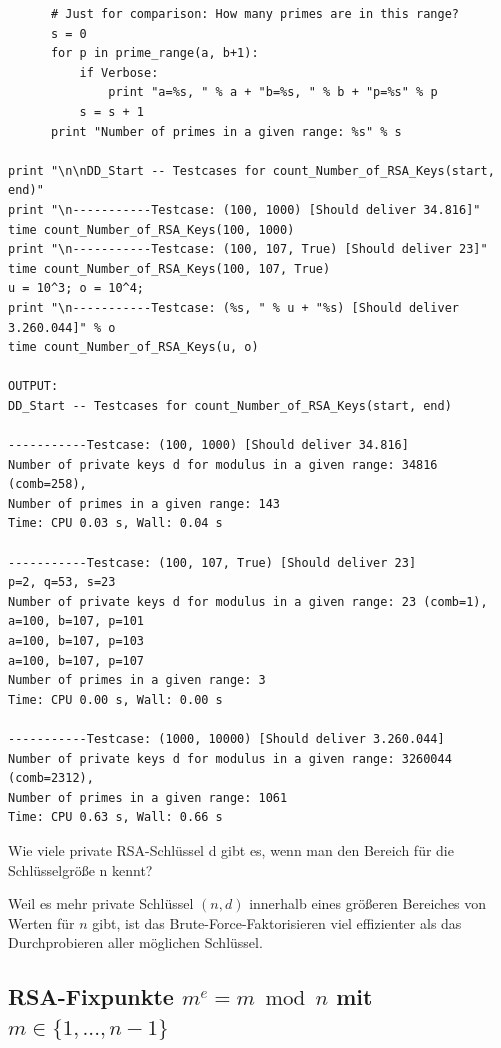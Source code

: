 \begin{refsegment}
\begin{sagecode}
\begin{Verbatim}
      # Just for comparison: How many primes are in this range?
      s = 0
      for p in prime_range(a, b+1):
          if Verbose:
              print "a=%s, " % a + "b=%s, " % b + "p=%s" % p
          s = s + 1
      print "Number of primes in a given range: %s" % s

print "\n\nDD_Start -- Testcases for count_Number_of_RSA_Keys(start, end)"
print "\n-----------Testcase: (100, 1000) [Should deliver 34.816]"
time count_Number_of_RSA_Keys(100, 1000)
print "\n-----------Testcase: (100, 107, True) [Should deliver 23]"
time count_Number_of_RSA_Keys(100, 107, True)
u = 10^3; o = 10^4;
print "\n-----------Testcase: (%s, " % u + "%s) [Should deliver 3.260.044]" % o
time count_Number_of_RSA_Keys(u, o)

OUTPUT:
DD_Start -- Testcases for count_Number_of_RSA_Keys(start, end)

-----------Testcase: (100, 1000) [Should deliver 34.816]
Number of private keys d for modulus in a given range: 34816 (comb=258),
Number of primes in a given range: 143
Time: CPU 0.03 s, Wall: 0.04 s

-----------Testcase: (100, 107, True) [Should deliver 23]
p=2, q=53, s=23
Number of private keys d for modulus in a given range: 23 (comb=1),
a=100, b=107, p=101
a=100, b=107, p=103
a=100, b=107, p=107
Number of primes in a given range: 3
Time: CPU 0.00 s, Wall: 0.00 s

-----------Testcase: (1000, 10000) [Should deliver 3.260.044]
Number of private keys d for modulus in a given range: 3260044 (comb=2312),
Number of primes in a given range: 1061
Time: CPU 0.63 s, Wall: 0.66 s
\end{Verbatim}
\caption{Wie viele private RSA-Schlüssel d gibt es, wenn man den Bereich für die Schlüssel\-größe n kennt?}
\label{nt_sagesample_Count_RSA_Keys}
\end{sagecode}

 Weil es mehr private Schlüssel $(n, d)$ innerhalb eines größeren
Bereiches von Werten für $n$ gibt, ist das Brute-Force-Faktorisieren
viel effizienter als das Durchprobieren aller möglichen Schlüssel.




\hypertarget{NumberTheory_Sage_Number-of-RSA-FixedPoints}{}
\subsection
    [RSA-Fixpunkte \texorpdfstring{}{m = m\^{}e}]%
    {RSA-Fixpunkte $ m^e = m \bmod n $ mit $m \in \{1,...,n-1\}$ }
\label{l:NumberTheory_Sage_Number-of-RSA-FixedPoints}{}


\end{refsegment}
